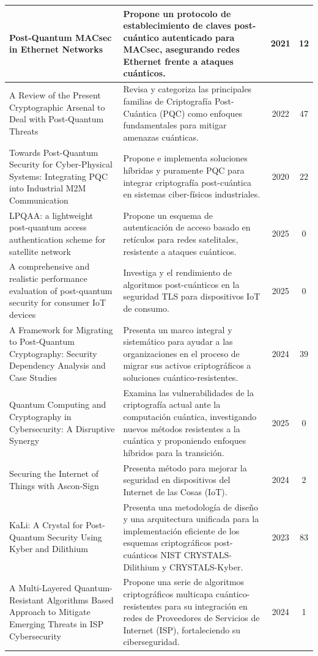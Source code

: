\begin{longtable}{@{} p{4.5cm} p{6.5cm} c c @{}}
Post-Quantum MACsec in Ethernet Networks~\cite{Cho2021} & Propone un protocolo de establecimiento de claves post-cuántico autenticado para MACsec, asegurando redes Ethernet frente a ataques cuánticos. & 2021 & 12 \\
\hline 
A Review of the Present Cryptographic Arsenal to Deal with Post-Quantum Threats~\cite{YALAMURI2022} & Revisa y categoriza las principales familias de Criptografía Post-Cuántica (PQC) como enfoques fundamentales para mitigar amenazas cuánticas. & 2022 & 47 \\
\hline
Towards Post-Quantum Security for Cyber-Physical Systems: Integrating PQC into Industrial M2M Communication~\cite{Paul2020} & Propone e implementa soluciones híbridas y puramente PQC para integrar criptografía post-cuántica en sistemas ciber-físicos industriales. & 2020 & 22 \\
\hline
LPQAA: a lightweight post-quantum access authentication scheme for satellite network~\cite{Wang2025} & Propone un esquema de autenticación de acceso basado en retículos para redes satelitales, resistente a ataques cuánticos. & 2025 & 0 \\
\hline
A comprehensive and realistic performance evaluation of post-quantum security for consumer IoT devices~\cite{HANNA2025} & Investiga y el rendimiento de algoritmos post-cuánticos en la seguridad TLS para dispositivos IoT de consumo. & 2025 & 0 \\
\hline
A Framework for Migrating to Post-Quantum Cryptography: Security Dependency Analysis and Case Studies~\cite{Hasan2024} & Presenta un marco integral y sistemático para ayudar a las organizaciones en el proceso de migrar sus activos criptográficos a soluciones cuántico-resistentes. & 2024 & 39 \\
\hline
Quantum Computing and Cryptography in Cybersecurity: A Disruptive Synergy~\cite{Maqousi2025} & Examina las vulnerabilidades de la criptografía actual ante la computación cuántica, investigando nuevos métodos resistentes a la cuántica y proponiendo enfoques híbridos para la transición. & 2025 & 0 \\
\hline
Securing the Internet of Things with Ascon-Sign~\cite{MAGYARI2024} & Presenta método para mejorar la seguridad en dispositivos del Internet de las Cosas (IoT). & 2024 & 2 \\
\hline
KaLi: A Crystal for Post-Quantum Security Using Kyber and Dilithium~\cite{Aikata2023} & Presenta una metodología de diseño y una arquitectura unificada para la implementación eficiente de los esquemas criptográficos post-cuánticos NIST CRYSTALS-Dilithium y CRYSTALS-Kyber. & 2023 & 83 \\
\hline
A Multi-Layered Quantum-Resistant Algorithms Based Approach to Mitigate Emerging Threats in ISP Cybersecurity~\cite{Alagh2024} & Propone una serie de algoritmos criptográficos multicapa cuántico-resistentes para su integración en redes de Proveedores de Servicios de Internet (ISP), fortaleciendo su ciberseguridad. & 2024 & 1 \\
\end{longtable}

